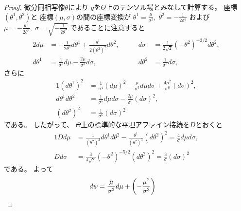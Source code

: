 \documentclass[report]{jlreq}
\begin{document}
\begin{proof}
    微分同相写像$\theta$により
    $g$を$\Theta$上のテンソル場とみなして計算する。
    座標$(\theta^1, \theta^2)$と
    座標$(\mu, \sigma)$の間の座標変換が
    $\theta^1 = \frac{\mu}{\sigma^2}, \;
        \theta^2 = -\frac{1}{2 \sigma^2}$
    および
    $\mu = -\frac{\theta^1}{2\theta^2}, \;
        \sigma = \sqrt{-\frac{1}{2\theta^2}}$
    であることに注意すると
    \begin{alignat}{2}
        d\mu
            &=
                - \frac{1}{2\theta^2} d\theta^1
                + \frac{\theta^1}{2(\theta^2)^2} d\theta^2,
            &\qquad
        d\sigma
            &=
                \frac{1}{2\sqrt{2}} (-\theta^2)^{-3/2} d\theta^2,
                \\
        d\theta^1
            &=
                \frac{1}{\sigma^2} d\mu
                - \frac{2\mu}{\sigma^3} d\sigma,
            &\qquad
        d\theta^2
            &=
                \frac{1}{\sigma^3} d\sigma,
    \end{alignat}
    さらに
    \begin{alignat}{1}
        (d\theta^1)^2
            &=
                \frac{1}{\sigma^4} (d\mu)^2
                - \frac{\mu}{\sigma^5} d\mu d\sigma
                + \frac{4\mu^2}{\sigma^6} (d\sigma)^2,
                \\
        d\theta^1 d\theta^2
            &=
                \frac{1}{\sigma^5} d\mu d\sigma
                - \frac{2\mu}{\sigma^6} (d\sigma)^2,
                \\
        (d\theta^2)^2
            &=
                \frac{1}{\sigma^6} (d\sigma)^2
    \end{alignat}
    である。
    したがって、
    $\Theta$上の標準的な平坦アファイン接続を$D$とおくと
    \begin{alignat}{1}
        Dd\mu
            &=
                \frac{1}{(\theta^2)^2} d\theta^1 d\theta^2
                - \frac{\theta^1}{(\theta^2)^3} (d\theta^2)^2
            =
                \frac{4}{\sigma} d\mu d\sigma,
                \\
        Dd\sigma
            &=
                \frac{3}{4\sqrt{2}} (-\theta^2)^{-5/2} (d\theta^2)^2
            =
                \frac{3}{\sigma} (d\sigma)^2
    \end{alignat}
    である。
    よって
    \begin{alignat}{1}
        d\psi
            &=
                \frac{\mu}{\sigma^2}
                d\mu
                + \left({
                    - \frac{\mu^2}{\sigma^3}
}\right)
\end{alignat}
\end{proof}
\end{document}
